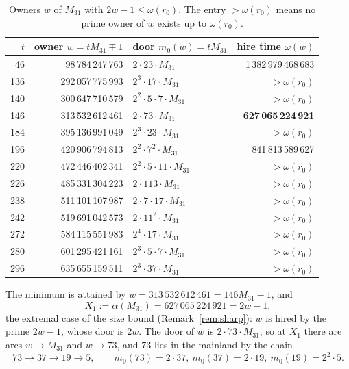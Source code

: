 \documentclass[11pt,a4paper]{article}
\theoremstyle{remark}
\begin{document}
\begin{table}[ht]
\centering\small
\begin{tabular}{rrlr}
\toprule
\(t\) & owner \(w=tM_{31}\mp1\) & door \(m_0(w)=tM_{31}\) & hire time \(\omega(w)\)\\
\midrule
46  & 98\,784\,247\,763  & \(2\cdot23\cdot M_{31}\)     & 1\,382\,979\,468\,683 \\
136 & 292\,057\,775\,993 & \(2^3\cdot17\cdot M_{31}\)   & \(>\omega(r_0)\)\\
140 & 300\,647\,710\,579 & \(2^2\cdot5\cdot7\cdot M_{31}\) & \(>\omega(r_0)\)\\
146 & 313\,532\,612\,461 & \(2\cdot73\cdot M_{31}\)     & \textbf{627\,065\,224\,921} \\
184 & 395\,136\,991\,049 & \(2^3\cdot23\cdot M_{31}\)   & \(>\omega(r_0)\)\\
196 & 420\,906\,794\,813 & \(2^2\cdot7^2\cdot M_{31}\)  & 841\,813\,589\,627 \\
220 & 472\,446\,402\,341 & \(2^2\cdot5\cdot11\cdot M_{31}\) & \(>\omega(r_0)\)\\
226 & 485\,331\,304\,223 & \(2\cdot113\cdot M_{31}\)    & \(>\omega(r_0)\)\\
238 & 511\,101\,107\,987 & \(2\cdot7\cdot17\cdot M_{31}\) & \(>\omega(r_0)\)\\
242 & 519\,691\,042\,573 & \(2\cdot11^2\cdot M_{31}\)   & \(>\omega(r_0)\)\\
272 & 584\,115\,551\,983 & \(2^4\cdot17\cdot M_{31}\)   & \(>\omega(r_0)\)\\
280 & 601\,295\,421\,161 & \(2^3\cdot5\cdot7\cdot M_{31}\) & \(>\omega(r_0)\)\\
296 & 635\,655\,159\,511 & \(2^3\cdot37\cdot M_{31}\)   & \(>\omega(r_0)\)\\
\bottomrule
\end{tabular}
\caption{Owners \(w\) of \(M_{31}\) with \(2w-1\le\omega(r_0)\). The entry \(>\omega(r_0)\) means no prime owner of \(w\) exists up to \(\omega(r_0)\).}
\label{tab:owners}
\end{table}

The minimum is attained by \(w=313\,532\,612\,461=146M_{31}-1\), and
\[
X_1:=\alpha(M_{31})=627\,065\,224\,921=2w-1 ,
\]
the extremal case of the size bound (Remark~\ref{rem:sharp}): \(w\) is hired by the prime \(2w-1\), whose door is \(2w\).
The door of \(w\) is \(2\cdot73\cdot M_{31}\), so at \(X_1\) there are arcs \(w\to M_{31}\) and \(w\to73\), and \(73\) lies in the mainland by the chain
\[
73\to 37\to 19\to 5,\qquad m_0(73)=2\cdot37,\ m_0(37)=2\cdot19,\ m_0(19)=2^2\cdot5 .
\]
\end{document}
